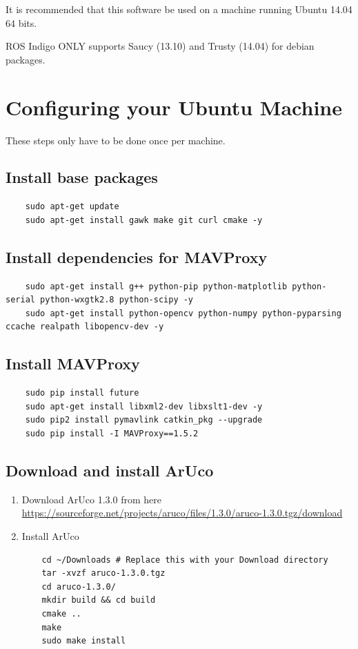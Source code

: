 \documentclass{report}
\begin{document}
It is recommended that this software be used on a machine running Ubuntu 14.04 64 bits.

ROS Indigo ONLY supports Saucy (13.10) and Trusty (14.04) for debian packages.

\section{Configuring your Ubuntu Machine}
These steps only have to be done once per machine.
\subsection{Install base packages}
\begin{lstlisting}
	sudo apt-get update
	sudo apt-get install gawk make git curl cmake -y
\end{lstlisting}

\subsection{Install dependencies for MAVProxy}
\begin{lstlisting}
	sudo apt-get install g++ python-pip python-matplotlib python-serial python-wxgtk2.8 python-scipy -y
	sudo apt-get install python-opencv python-numpy python-pyparsing ccache realpath libopencv-dev -y
\end{lstlisting}

\subsection{Install MAVProxy}
\begin{lstlisting}
	sudo pip install future
	sudo apt-get install libxml2-dev libxslt1-dev -y
	sudo pip2 install pymavlink catkin_pkg --upgrade
	sudo pip install -I MAVProxy==1.5.2
\end{lstlisting}

\subsection{Download and install ArUco}
\begin{enumerate}
	\item Download ArUco 1.3.0 from here \href{https://sourceforge.net/projects/aruco/files/1.3.0/aruco-1.3.0.tgz/download}{https://sourceforge.net/projects/aruco/files/1.3.0/aruco-1.3.0.tgz/download}
	
	\item Install ArUco

\begin{lstlisting}
	cd ~/Downloads # Replace this with your Download directory
	tar -xvzf aruco-1.3.0.tgz
	cd aruco-1.3.0/
	mkdir build && cd build
	cmake ..
	make
	sudo make install
\end{lstlisting}
\end{enumerate}
\end{document}
